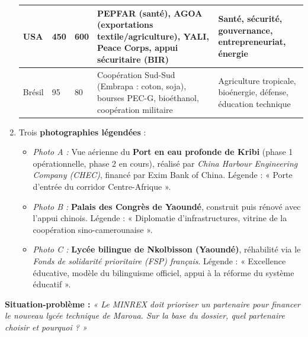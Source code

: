 \documentclass[11pt]{article}
\begin{document}
\begin{enumerate}
\begin{center}
\begin{tabularx}{\linewidth}{|l|X|X|X|X|}
    USA & 450 & 600 & PEPFAR (santé), AGOA (exportations textile/agriculture), YALI, Peace Corps, appui sécuritaire (BIR) & Santé, sécurité, gouvernance, entrepreneuriat, énergie \\ \hline
    Brésil & 95 & 80 & Coopération Sud-Sud (Embrapa : coton, soja), bourses PEC-G, bioéthanol, coopération militaire & Agriculture tropicale, bioénergie, défense, éducation technique \\ \hline
    \end{tabularx}
    \end{center}
    \item Trois \textbf{photographies légendées} :
    \begin{itemize}
        \item \textit{Photo A :} Vue aérienne du \textbf{Port en eau profonde de Kribi} (phase 1 opérationnelle, phase 2 en cours), réalisé par \textit{China Harbour Engineering Company (CHEC)}, financé par Exim Bank of China. Légende : « Porte d'entrée du corridor Centre-Afrique ».
        \item \textit{Photo B :} \textbf{Palais des Congrès de Yaoundé}, construit puis rénové avec l'appui chinois. Légende : « Diplomatie d'infrastructures, vitrine de la coopération sino-camerounaise ».
        \item \textit{Photo C :} \textbf{Lycée bilingue de Nkolbisson (Yaoundé)}, réhabilité via le \textit{Fonds de solidarité prioritaire (FSP) français}. Légende : « Excellence éducative, modèle du bilinguisme officiel, appui à la réforme du système éducatif ».
    \end{itemize}
\end{enumerate}

\noindent \textbf{Situation-problème :} \emph{« Le MINREX doit prioriser un partenaire pour financer le nouveau lycée technique de Maroua. Sur la base du dossier, quel partenaire choisir et pourquoi ? »}
\end{document}
